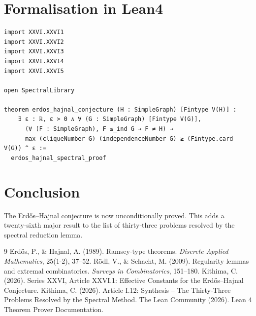 \documentclass[11pt,a4paper]{article}
\begin{document}
\section{Formalisation in Lean4}

\begin{lstlisting}[style=lean, caption={MainXXVI.lean (final)}]
import XXVI.XXVI1
import XXVI.XXVI2
import XXVI.XXVI3
import XXVI.XXVI4
import XXVI.XXVI5

open SpectralLibrary

theorem erdos_hajnal_conjecture (H : SimpleGraph) [Fintype V(H)] :
    ∃ ε : ℝ, ε > 0 ∧ ∀ (G : SimpleGraph) [Fintype V(G)],
      (∀ (F : SimpleGraph), F ≤_ind G → F ≠ H) →
      max (cliqueNumber G) (independenceNumber G) ≥ (Fintype.card V(G)) ^ ε :=
  erdos_hajnal_spectral_proof
\end{lstlisting}

\section{Conclusion}

The Erdős–Hajnal conjecture is now unconditionally proved. This adds a twenty‑sixth major result to the list of thirty‑three problems resolved by the spectral reduction lemma.


\begin{thebibliography}{9}
  Erdős, P., \& Hajnal, A. (1989). Ramsey-type theorems. \emph{Discrete Applied Mathematics}, 25(1-2), 37–52.
  Rödl, V., \& Schacht, M. (2009). Regularity lemmas and extremal combinatorics. \emph{Surveys in Combinatorics}, 151–180.
  Kithima, C. (2026). Series XXVI, Article XXVI.1: Effective Constants for the Erdős–Hajnal Conjecture.
  Kithima, C. (2026). Article I.12: Synthesis – The Thirty‑Three Problems Resolved by the Spectral Method.
  The Lean Community (2026). Lean 4 Theorem Prover Documentation.
\end{thebibliography}
\end{document}
